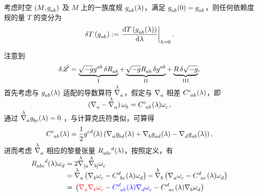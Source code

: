 		\begin{Proof}
			\label{prf_EEq}
			考虑时空 $(M,\tensor{g}{_a_b})$ 及 $M$ 上的一族度规 $\tensor{g}{_a_b}(\lambda)$，满足 $\tensor{g}{_a_b}(0)=\tensor{g}{_a_b}$，则任何依赖度规的量 $T$ 的变分为
			\begin{equation}
				\var T\left( \tensor{g}{_a_b} \right) \definedby \left. \dv{T\left( \tensor{g}{_a_b}(\lambda) \right)}{\lambda}  \right|_{\lambda=0}.
			\end{equation}

			注意到
			\begin{equation}
				\var{\Lad} = \underbrace{\sqrt{-g} \tensor{g}{^a^b} \var{\tensor{R}{_a_b}}}_{\RomanNumeralCaps{1}} + \underbrace{\sqrt{-g} \tensor{R}{_a_b} \var{\tensor{g}{^a^b}}}_{\RomanNumeralCaps{2}} + \underbrace{R \var{\sqrt{-g}}}_{\RomanNumeralCaps{3}},\label{eq-varL_EH}
			\end{equation}
			首先考虑与 $\tensor{g}{_a_b}(\lambda)$ 适配的导数算符 $\tensor{\myvaried{\nabla}}{_a}$，假定与 $\Nabla{a}$ 相差 $\tensor{C}{^c_a_b}(\lambda)$，即
			\begin{equation}
				\left( \Nabla{a} - \tensor{\myvaried{\nabla}}{_a} \right) \tensor{\omega}{_b} = \tensor{C}{^c_a_b}(\lambda) \tensor{\omega}{_c},
			\end{equation}
			通过 $\tensor{\myvaried{\nabla}}{_a} \tensor{g}{_b_c}(\lambda) = 0$ ，与计算克氏符类似，可算得
			\begin{equation}
				\tensor{C}{^c_a_b}(\lambda) = \frac{1}{2} \tensor{g}{^c^d}(\lambda) \left( \Nabla{a} \tensor{g}{_b_d}(\lambda) + \Nabla{b} \tensor{g}{_a_d}(\lambda) - \Nabla{d} \tensor{g}{_a_b}(\lambda) \right),\label{eq-Clambda}
			\end{equation}
			进而考虑 $\tensor{\myvaried{\nabla}}{_a}$ 相应的黎曼张量 $\tensor{R}{_a_b_c^d}(\lambda)$，按照定义，有
			\begin{equation}
				\begin{split}
					\tensor{R}{_a_b_c^d}(\lambda) \tensor{\omega}{_d} ={}& 2 \tensor{\myvaried{\nabla}}{_{[a}} \tensor{\myvaried{\nabla}}{_{b]}} \tensor{\omega}{_c}\\
					={}& \tensor{\myvaried{\nabla}}{_a} \left( \Nabla{b} \tensor{\omega}{_c} - \tensor{C}{^d_b_c}(\lambda) \tensor{\omega}{_d} \right) - \tensor{\myvaried{\nabla}}{_b} \left( \Nabla{a} \tensor{\omega}{_c} - \tensor{C}{^d_a_c}(\lambda) \tensor{\omega}{_d} \right)\\
					={}& \left( {\color{red}\Nabla{a} \Nabla{b}\tensor{\omega}{_c}} - {\color{blue}\tensor{C}{^d_a_b}(\lambda) \Nabla{d} \tensor{\omega}{_c}} - \tensor{C}{^d_a_c}(\lambda) \Nabla{b} \tensor{\omega}{_d} \right)\\

\end{split}
\end{equation}
\end{Proof}
